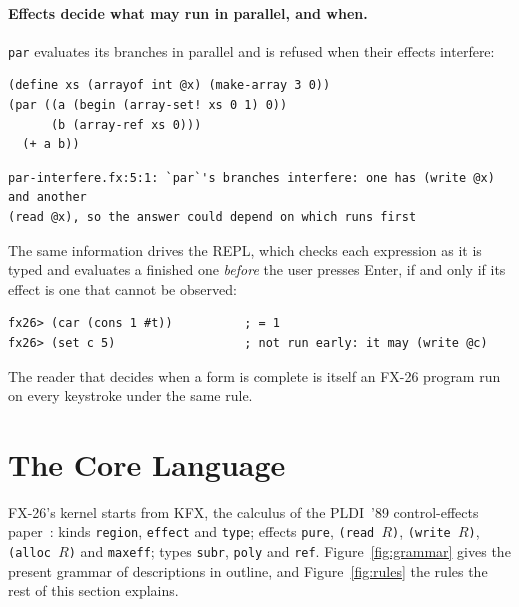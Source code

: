 \documentclass[acmsmall,screen,review]{acmart}
\newcommand{\cd}[1]{\texttt{#1}}
\newcommand{\fx}{FX-26}
\begin{document}
\paragraph{Effects decide what may run in parallel, and when.}
\cd{par} evaluates its branches in parallel and is refused when their
effects interfere:
\begin{lstlisting}
(define xs (arrayof int @x) (make-array 3 0))
(par ((a (begin (array-set! xs 0 1) 0))
      (b (array-ref xs 0)))
  (+ a b))
\end{lstlisting}
\begin{lstlisting}[style=out]
par-interfere.fx:5:1: `par`'s branches interfere: one has (write @x) and another
(read @x), so the answer could depend on which runs first
\end{lstlisting}
The same information drives the REPL, which checks each expression as it
is typed and evaluates a finished one \emph{before} the user presses
Enter, if and only if its effect is one that cannot be observed:
\begin{lstlisting}[style=out]
fx26> (car (cons 1 #t))          ; = 1
fx26> (set c 5)                  ; not run early: it may (write @c)
\end{lstlisting}
The reader that decides when a form is complete is itself an \fx{}
program run on every keystroke under the same rule.

\section{The Core Language}
\label{sec:core}

\fx's kernel starts from KFX, the calculus of the PLDI~'89 control-effects
paper~\cite{jouvelot-gifford}: kinds \cd{region}, \cd{effect} and
\cd{type}; effects \cd{pure}, \cd{(read $R$)}, \cd{(write $R$)},
\cd{(alloc $R$)} and \cd{maxeff}; types \cd{subr}, \cd{poly} and
\cd{ref}. Figure~\ref{fig:grammar} gives the present grammar of
descriptions in outline, and Figure~\ref{fig:rules} the rules the rest
of this section explains.
\end{document}

